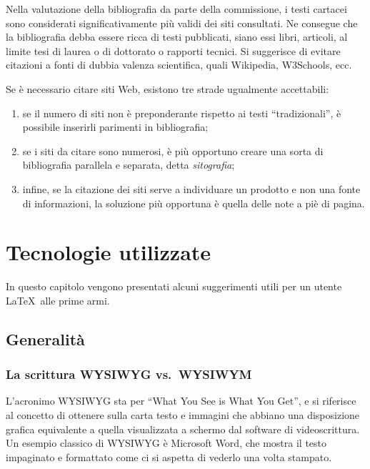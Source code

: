 \documentclass[12pt]{report}
\begin{document}
Nella valutazione della bibliografia da parte della commissione, i testi cartacei sono considerati significativamente più validi dei siti consultati. Ne consegue che la bibliografia debba essere ricca di testi pubblicati, siano essi libri, articoli, al limite tesi di laurea o di dottorato o rapporti tecnici. Si suggerisce di evitare citazioni a fonti di dubbia valenza scientifica, quali Wikipedia, W3Schools, ecc.

Se è necessario citare siti Web, esistono tre strade ugualmente accettabili:
\begin{enumerate}
	\item se il numero di siti non è preponderante rispetto ai testi ``tradizionali'', è possibile inserirli parimenti in bibliografia;
	\item se i siti da citare sono numerosi, è più opportuno creare una sorta di bibliografia parallela e separata, detta \textit{sitografia};
	\item infine, se la citazione dei siti serve a individuare un prodotto e non una fonte di informazioni, la soluzione più opportuna è quella delle note a piè di pagina.
\end{enumerate}





% 
% 

\chapter{Tecnologie utilizzate}
\label{cap3}

In questo capitolo vengono presentati alcuni suggerimenti utili per un utente \LaTeX\ alle prime armi.


\section{Generalit\`a}

\subsection{La scrittura WYSIWYG vs.\ WYSIWYM}

L'acronimo WYSIWYG sta per ``What You See is What You Get'', e si riferisce al concetto di ottenere sulla carta testo e immagini che abbiano una disposizione grafica equivalente a quella visualizzata a schermo dal software di videoscrittura. Un esempio classico di WYSIWYG è Microsoft Word, che mostra il testo impaginato e formattato come ci si aspetta di vederlo una volta stampato.
\end{document}
